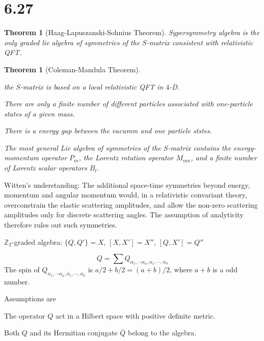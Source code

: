 \documentclass[11pt]{article}
\newcommand{\zz}{\mathbb{Z}}
\theoremstyle{definition}
\theoremstyle{plain}
\newtheorem{thm}[para]{Theorem}
\begin{document}
\section{6.27}

\begin{thm}[Haag-Lapuszanski-Sohnius Theorem]
Sypersymmetry algebra is the only graded lie algebra of symmetries of the
$S$-matrix consistent with relativistic QFT.
\end{thm}

\begin{thm}[Coleman-Mandula Theorem]~
\begin{compactenum}
\item the $S$-matrix is based on a local relativistic QFT in $4$-D.
\item There are only a finite number of different particles associated 
with one-particle states of a given mass.
\item There is a energy gap between the vacumm and one particle ststes.
\end{compactenum}
The most general Lie algebra of symmetries of the $S$-matrix contains
the energy-momentum operator $P_m$, the Lorentz rotation operator
$M_{mn}$, and a finite number of Lorentz scalar operators $B_l$.
\end{thm}

Witten's understanding: The additional space-time symmetries beyond
energy, momentum and angular momentum would, in a relativistic convariant
theory, overconstrain the elastic scattering amplitudes, and allow the 
non-zero scattering amplitudes only for discrete scattering angles. 
The assumption of analyticity therefore rules out such symmetries.

\vspace{2ex}

$\zz_2$-graded algebra: $\{Q,Q'\}=X$, $[X,X']=X''$, $[Q,X']=Q''$

\[
	Q=\sum Q_{\alpha_1,\cdots \alpha_a,\dot\alpha_1,\cdots,\dot\alpha_b}
\]
The spin of $Q_{\alpha_1,\cdots \alpha_a,\dot\alpha_1,\cdots,\dot\alpha_b}$
is $a/2+b/2=(a+b)/2$, where $a+b$ is a odd number.

\vspace{2ex}

Assumptions are
\begin{compactenum}[(1)]
\item The operator $Q$ act in a Hilbert space with positive definite metric.
\item Both $Q$ and its Hermitian conjugate $\bar Q$ belong to the algebra.
\end{compactenum}
\end{document}
